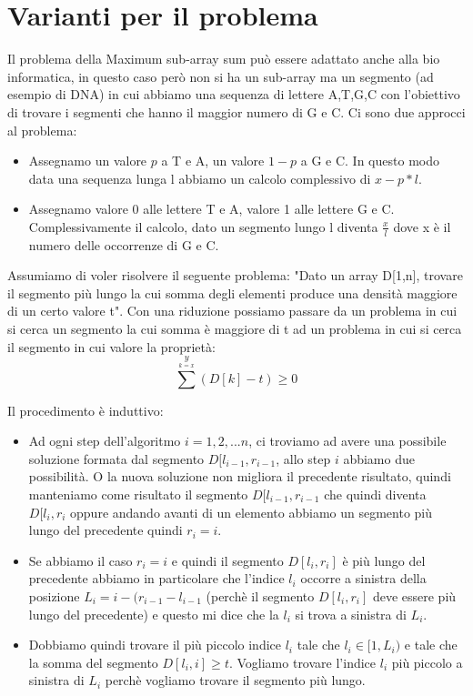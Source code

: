 \documentclass[14pt]{extreport}
\begin{document}
\section{Varianti per il problema}

Il problema della Maximum sub-array sum può essere adattato anche alla bio informatica, in questo caso però non si ha un sub-array ma un segmento (ad esempio di DNA) in cui abbiamo una sequenza di lettere A,T,G,C con l'obiettivo di trovare i segmenti che hanno il maggior numero di G e C.
Ci sono due approcci al problema:
\begin{itemize}
    \item Assegnamo un valore $p$ a T e A, un valore $1-p$ a G e C. In questo modo data una sequenza lunga l abbiamo un calcolo complessivo di $x-p*l$.
    \item Assegnamo valore 0 alle lettere T e A, valore 1 alle lettere G e C. Complessivamente il calcolo, dato un segmento lungo l diventa $\frac{x}{l}$ dove x è il numero delle occorrenze di G e C.
\end{itemize}

Assumiamo di voler risolvere il seguente problema:
\newline
"Dato un array D[1,n], trovare il segmento più lungo la cui somma degli elementi produce una densità maggiore di un certo valore t".
\newline
Con una riduzione possiamo passare da un problema in cui si cerca un segmento la cui somma è maggiore di t ad un problema in cui si cerca il segmento in cui valore la proprietà:
\begin{equation}
    \sum^y \limits_{k=x} (D[k]-t) \geq 0
\end{equation}

Il procedimento è induttivo:
\begin{itemize}
    \item Ad ogni step dell'algoritmo $i=1,2,...n$, ci troviamo ad avere una possibile soluzione formata dal segmento $D[l_{i-1}, r_{i-1}$, allo step $i$ abbiamo due possibilità. O la nuova soluzione non migliora il precedente risultato, quindi manteniamo come risultato il segmento $D[l_{i-1}, r_{i-1}$ che quindi diventa $D[l_{i}, r_{i}$ oppure andando avanti di un elemento abbiamo un segmento più lungo del precedente quindi $r_i = i$.
    \item Se abbiamo il caso $r_i = i$ e quindi il segmento $D[l_i, r_i]$ è più lungo del precedente abbiamo in particolare che l'indice $l_i$ occorre a sinistra della posizione $L_i = i - (r_{i-1} - l_{i-1}$ (perchè il segmento $D[l_i, r_i]$ deve essere più lungo del precedente) e questo mi dice che la $l_i$ si trova a sinistra di $L_i$.
    \item Dobbiamo quindi trovare il più piccolo indice $l_i$ tale che $l_i \in [1,L_i)$ e tale che la somma del segmento $D[l_i,i] \geq t$.
    Vogliamo trovare l'indice $l_i$ più piccolo a sinistra di $L_i$ perchè vogliamo trovare il segmento più lungo.
\end{itemize}
\end{document}
